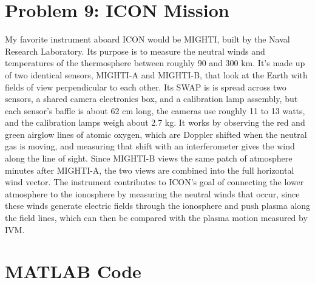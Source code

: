 \documentclass[11pt]{article}
\begin{document}
\section*{Problem 9: ICON Mission}
\hspace*{2em}My favorite instrument aboard ICON would be MIGHTI, built by the Naval Research Laboratory.
Its purpose is to measure the neutral winds and temperatures of the thermosphere between roughly 90 and 300 km.
It's made up of two identical sensors, MIGHTI-A and MIGHTI-B, that look at the Earth with fields of view
perpendicular to each other. Its SWAP is is spread across two sensors, a shared camera
electronics box, and a calibration lamp assembly, but each sensor's baffle is about 62 cm long, the cameras use
roughly 11 to 13 watts, and the calibration lamps weigh about 2.7 kg. It works by observing the red and
green airglow lines of atomic oxygen, which are Doppler shifted when the neutral gas is moving, and
measuring that shift with an interferometer gives the wind along the line of sight. Since MIGHTI-B views the same
patch of atmosphere minutes after MIGHTI-A, the two views are combined into the full horizontal wind vector.
The instrument contributes to ICON's goal of connecting the lower atmosphere to the ionosphere by measuring the neutral winds that
occur, since these winds generate electric fields through the ionosphere and push plasma along the field lines,
which can then be compared with the plasma motion measured by IVM.

\newpage
\section*{MATLAB Code}
\end{document}
